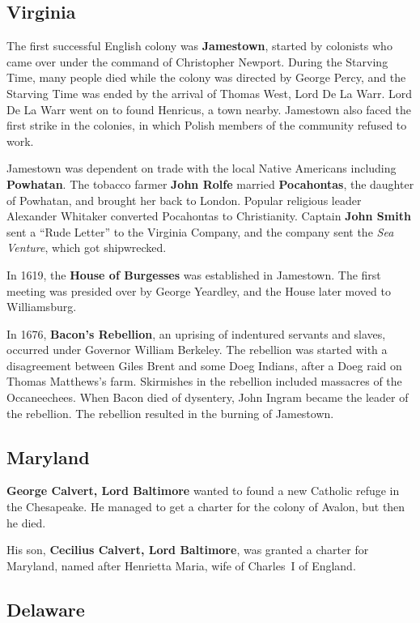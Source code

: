\subsection*{Virginia}

The first successful English colony was \textbf{Jamestown},
started by colonists who came over under the command of Christopher Newport.
During the Starving Time, many people died while the colony was directed by George Percy,
and the Starving Time was ended by the arrival of Thomas West, Lord De La Warr.
Lord De La Warr went on to found Henricus, a town nearby.
Jamestown also faced the first strike in the colonies,
in which Polish members of the community refused to work.

Jamestown was dependent on trade with the local Native Americans including \textbf{Powhatan}.
The tobacco farmer \textbf{John Rolfe} married \textbf{Pocahontas},
the daughter of Powhatan, and brought her back to London.
Popular religious leader Alexander Whitaker converted Pocahontas to Christianity.
Captain \textbf{John Smith} sent a ``Rude Letter'' to the Virginia Company,
and the company sent the \textit{Sea Venture}, which got shipwrecked.

In 1619, the \textbf{House of Burgesses} was established in Jamestown.
The first meeting was presided over by George Yeardley, and the House later moved to Williamsburg.

In 1676, \textbf{Bacon's Rebellion}, an uprising of indentured servants and slaves,
occurred under Governor William Berkeley.
The rebellion was started with a disagreement between Giles Brent and some Doeg Indians,
after a Doeg raid on Thomas Matthews's farm.
Skirmishes in the rebellion included massacres of the Occaneechees.
When Bacon died of dysentery, John Ingram became the leader of the rebellion.
The rebellion resulted in the burning of Jamestown.

\subsection*{Maryland}

\textbf{George Calvert, Lord Baltimore} wanted to found a new Catholic refuge in the Chesapeake.
He managed to get a charter for the colony of Avalon, but then he died.

His son, \textbf{Cecilius Calvert, Lord Baltimore}, was granted a charter for Maryland,
named after Henrietta Maria, wife of Charles~I of England.

\subsection*{Delaware}

